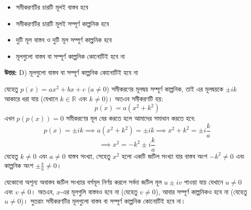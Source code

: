 \documentclass[12pt, a4paper]{article}
\begin{document}
\begin{itemize}[label={}, leftmargin=1cm, itemsep=0.5em]
    \item[\textbf{A)}] সমীকরণটির চারটি মূলই বাস্তব হবে
    \item[\textbf{B)}] সমীকরণটির চারটি মূলই সম্পূর্ণ কাল্পনিক হবে
    \item[\textbf{C)}] দুটি মূল বাস্তব ও দুটি মূল সম্পূর্ণ কাল্পনিক হবে
    \item[\textbf{D)}] মূলগুলো বাস্তব বা সম্পূর্ণ কাল্পনিক কোনোটিই হবে না
\end{itemize}

\vspace{0.5em}
\begin{tcolorbox}[answerbox]
    \textbf{\color{success} উত্তর:} D) মূলগুলো বাস্তব বা সম্পূর্ণ কাল্পনিক কোনোটিই হবে না
\end{tcolorbox}
\vspace{1em}

\begin{tcolorbox}[solutionbox={সমাধান (Solution)}]
    \noindent
    যেহেতু $p(x) = ax^2 + bx + c$ ($a \ne 0$) সমীকরণের মূলদ্বয় সম্পূর্ণ কাল্পনিক, তাই এর মূলদ্বয়কে $\pm ik$ আকারে ধরা যায় (যেখানে $k \in \mathbb{R}$ এবং $k \ne 0$)। অতএব সমীকরণটি হয়:
    \[ p(x) = a(x^2 + k^2) \]
    এখন $p(p(x)) = 0$ সমীকরণের মূল বের করতে হলে আমাদের সমাধান করতে হবে:
    \[ p(x) = \pm ik \implies a(x^2 + k^2) = \pm ik \implies x^2 + k^2 = \pm i \frac{k}{a} \]
    \[ \implies x^2 = -k^2 \pm i \frac{k}{a} \]
    যেহেতু $k \ne 0$ এবং $a \ne 0$ বাস্তব সংখ্যা, সেহেতু $x^2$ হলো একটি জটিল সংখ্যা যার বাস্তব অংশ $-k^2 \ne 0$ এবং কাল্পনিক অংশ $\pm \frac{k}{a} \ne 0$।
    
    \vspace{0.5em}
    যেকোনো অশূন্য অবাস্তব জটিল সংখ্যার বর্গমূল নির্ণয় করলে সর্বদা জটিল মূল $u \pm iv$ পাওয়া যায় যেখানে $u \ne 0$ এবং $v \ne 0$। অতএব, $x$-এর মূলগুলি বাস্তবও হবে না (যেহেতু $v \ne 0$), আবার সম্পূর্ণ কাল্পনিকও হবে না (যেহেতু $u \ne 0$)। সুতরাং সমীকরণটির মূলগুলো বাস্তব বা সম্পূর্ণ কাল্পনিক কোনোটিই হবে না।
\end{tcolorbox}
\vspace{1em}
\end{document}
